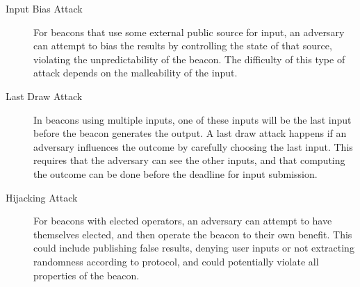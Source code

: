 \begin{description}
    \item[Input Bias Attack] For beacons that use some external public source for input, an adversary can attempt to bias the results by controlling the state of that source, violating the unpredictability of the beacon.
        The difficulty of this type of attack depends on the malleability of the input.
    \item[Last Draw Attack] In beacons using multiple inputs, one of these inputs will be the last input before the beacon generates the output.
        A last draw attack happens if an adversary influences the outcome by carefully choosing the last input.
        This requires that the adversary can see the other inputs, and that computing the outcome can be done before the deadline for input submission.
    \item[Hijacking Attack] For beacons with elected operators, an adversary can attempt to have themselves elected, and then operate the beacon to their own benefit.
        This could include publishing false results, denying user inputs or not extracting randomness according to protocol, and could potentially violate all properties of the beacon. %

\end{description}

